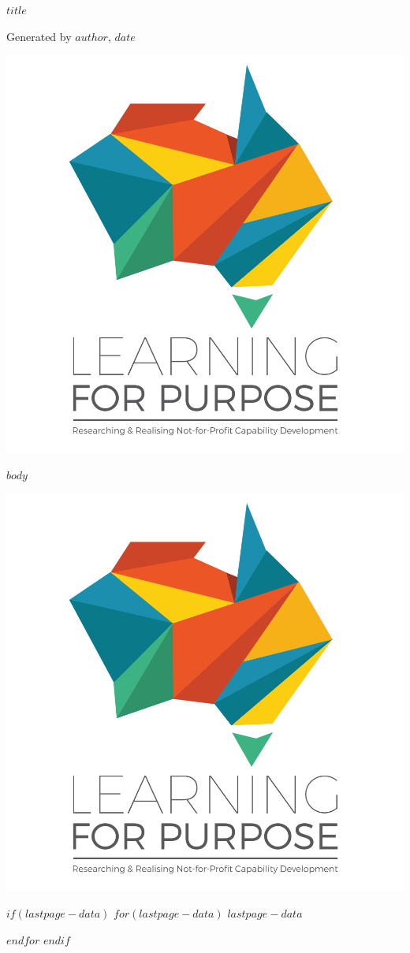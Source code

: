 \documentclass[11pt, a4paper]{article}
\begin{document}
\pagestyle{fancy}

\begin{titlepage}
	\centering
	
	{%
		\fontsize{30pt}{30pt}\selectfont
		$title$
	}%
	
	\vspace*{2\baselineskip}
	{\footnotesize Generated by $author$, $date$}
	
	\vspace*{5\baselineskip}
	
	\includegraphics[width=.75\textwidth]{LFP_vertical_tagline.png}
	
	\vspace*{\baselineskip}
	
	\tableofcontents
	
	\thispagestyle{empty}
\end{titlepage}

\clearpage

\onehalfspacing
\raggedright

$body$

\clearpage

{
	\thispagestyle{empty}
	\centering
	\includegraphics[width=.75\textwidth]{LFP_vertical_tagline.png}
	\setlength{\parskip}{.5ex}
	
	\vfill

	\footnotesize
	$if(lastpage-data)$
		$for(lastpage-data)$
			$lastpage-data$ \par
		$endfor$
	$endif$
}
\end{document}
